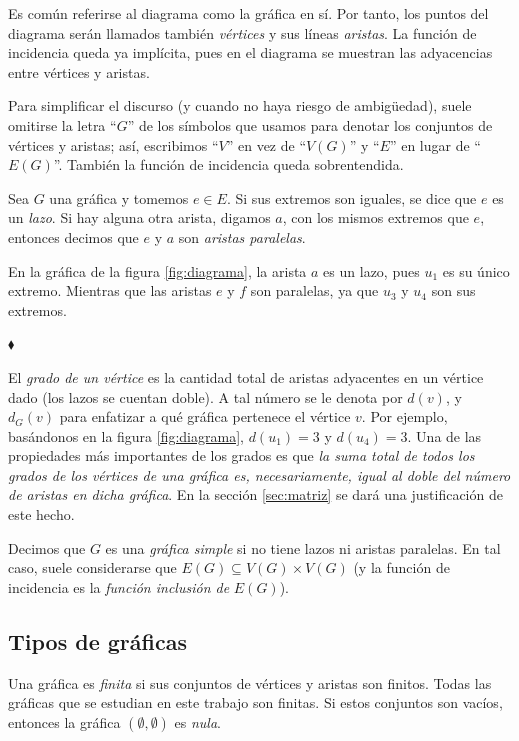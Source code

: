 Es común referirse al diagrama como la gráfica en sí. Por tanto, los puntos del diagrama serán llamados también \textit{vértices} y sus líneas \textit{aristas}. La función de incidencia queda ya implícita, pues en el diagrama se muestran las adyacencias entre vértices y aristas.

Para simplificar el discurso (y cuando no haya riesgo de ambigüedad), suele omitirse la letra ``$G$'' de los símbolos que usamos para denotar los conjuntos de vértices y aristas; así, escribimos ``$V$'' en vez de ``$V(G)$'' y ``$E$'' en lugar de ``$E(G)$''. También la función de incidencia queda sobrentendida.

Sea $G$ una gráfica y tomemos $e \in E$. Si sus extremos son iguales, se dice que $e$ es un \textit{lazo}. Si hay alguna otra arista, digamos $a$, con los mismos extremos que $e$, entonces decimos que $e$ y $a$ son \textit{aristas paralelas}.
\begin{ejem}
En la gráfica de la figura \ref{fig:diagrama}, la arista $a$ es un lazo, pues $u_{1}$ es su único extremo. Mientras que las aristas $e$ y $f$ son paralelas, ya que $u_{3}$ y $u_{4}$ son sus extremos.

\hfill $\blacklozenge$
\end{ejem}
El \textit{grado de un vértice}  es la cantidad total de aristas adyacentes en un vértice dado (los lazos se cuentan doble). A tal número se le denota por $d(v)$, y  $d_{G}(v)$ para enfatizar a qué gráfica pertenece el vértice $v$. Por ejemplo, basándonos en la figura \ref{fig:diagrama}, $d(u_{1})=3$ y $d(u_{4}) = 3$. Una de las propiedades más importantes de los grados es que \textit{la suma total de todos los grados de los vértices de una gráfica es, necesariamente, igual al doble del número de aristas en dicha gráfica}. En la sección \ref{sec:matriz} se dará una justificación de este hecho.

Decimos que $G$ es una \textit{gráfica simple} si no tiene lazos ni aristas paralelas. En tal caso, suele considerarse que $E(G) \subseteq V(G) \times V(G)$ (y la función de incidencia es la \textit{función inclusión de} $E(G)$). 

\subsection{Tipos de gráficas} \label{sec:tiposdegraficas}
Una gráfica es \textit{finita} si sus conjuntos de vértices y aristas son finitos. Todas las gráficas que se estudian en este trabajo son finitas. Si estos conjuntos son vacíos, entonces la gráfica $(\emptyset, \emptyset)$ es \textit{nula}. 

